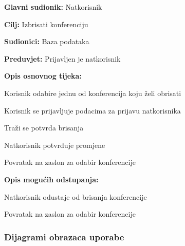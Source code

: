 					\noindent {}
					\begin{packed_item}
						
						\item \textbf{Glavni sudionik: } Natkorisnik
						\item  \textbf{Cilj:} Izbrisati konferenciju
						\item  \textbf{Sudionici:} Baza podataka
						\item  \textbf{Preduvjet:} Prijavljen je natkorisnik
						\item  \textbf{Opis osnovnog tijeka:}
						
						\item[] \begin{packed_enum}
							
							\item Korisnik odabire jednu od konferencija koju želi obrisati
							\item Korisnik se prijavljuje podacima za prijavu natkorisnika
							\item Traži se potvrda brisanja
							\item Natkorisnik potvrđuje promjene
							\item Povratak na zaslon za odabir konferencije
							
						\end{packed_enum}
						
						\item  \textbf{Opis mogućih odstupanja:}
						
						\item[] \begin{packed_item}
							
							\item[4.a] Natkorisnik odustaje od brisanja konferencije
							\item[] \begin{packed_enum}
								
								\item Povratak na zaslon za odabir konferencije
								
							\end{packed_enum}
							
						\end{packed_item}
						
					\end{packed_item}
					
				\subsubsection{Dijagrami obrazaca uporabe}
					

